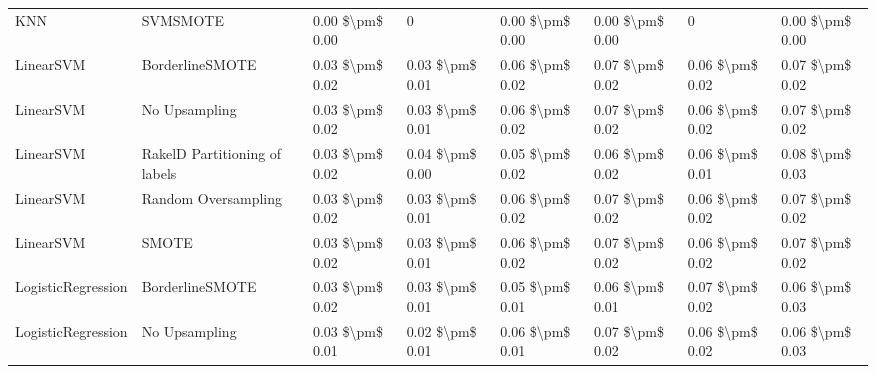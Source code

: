 \begin{tabular}{llllllll}
                            KNN &                      SVMSMOTE & 0.00 \$\textbackslash pm\$ 0.00 &                         0 &       0.00 \$\textbackslash pm\$ 0.00 &        0.00 \$\textbackslash pm\$ 0.00 &                                       0 &     0.00 \$\textbackslash pm\$ 0.00 \\
                      LinearSVM &               BorderlineSMOTE & 0.03 \$\textbackslash pm\$ 0.02 &           0.03 \$\textbackslash pm\$ 0.01 &       0.06 \$\textbackslash pm\$ 0.02 &        0.07 \$\textbackslash pm\$ 0.02 &                         0.06 \$\textbackslash pm\$ 0.02 &     0.07 \$\textbackslash pm\$ 0.02 \\
                      LinearSVM &                 No Upsampling & 0.03 \$\textbackslash pm\$ 0.02 &           0.03 \$\textbackslash pm\$ 0.01 &       0.06 \$\textbackslash pm\$ 0.02 &        0.07 \$\textbackslash pm\$ 0.02 &                         0.06 \$\textbackslash pm\$ 0.02 &     0.07 \$\textbackslash pm\$ 0.02 \\
                      LinearSVM & RakelD Partitioning of labels & 0.03 \$\textbackslash pm\$ 0.02 &           0.04 \$\textbackslash pm\$ 0.00 &       0.05 \$\textbackslash pm\$ 0.02 &        0.06 \$\textbackslash pm\$ 0.02 &                         0.06 \$\textbackslash pm\$ 0.01 &     0.08 \$\textbackslash pm\$ 0.03 \\
                      LinearSVM &           Random Oversampling & 0.03 \$\textbackslash pm\$ 0.02 &           0.03 \$\textbackslash pm\$ 0.01 &       0.06 \$\textbackslash pm\$ 0.02 &        0.07 \$\textbackslash pm\$ 0.02 &                         0.06 \$\textbackslash pm\$ 0.02 &     0.07 \$\textbackslash pm\$ 0.02 \\
                      LinearSVM &                         SMOTE & 0.03 \$\textbackslash pm\$ 0.02 &           0.03 \$\textbackslash pm\$ 0.01 &       0.06 \$\textbackslash pm\$ 0.02 &        0.07 \$\textbackslash pm\$ 0.02 &                         0.06 \$\textbackslash pm\$ 0.02 &     0.07 \$\textbackslash pm\$ 0.02 \\
             LogisticRegression &               BorderlineSMOTE & 0.03 \$\textbackslash pm\$ 0.02 &           0.03 \$\textbackslash pm\$ 0.01 &       0.05 \$\textbackslash pm\$ 0.01 &        0.06 \$\textbackslash pm\$ 0.01 &                         0.07 \$\textbackslash pm\$ 0.02 &     0.06 \$\textbackslash pm\$ 0.03 \\
             LogisticRegression &                 No Upsampling & 0.03 \$\textbackslash pm\$ 0.01 &           0.02 \$\textbackslash pm\$ 0.01 &       0.06 \$\textbackslash pm\$ 0.01 &        0.07 \$\textbackslash pm\$ 0.02 &                         0.06 \$\textbackslash pm\$ 0.02 &     0.06 \$\textbackslash pm\$ 0.03 \\

\end{tabular}
